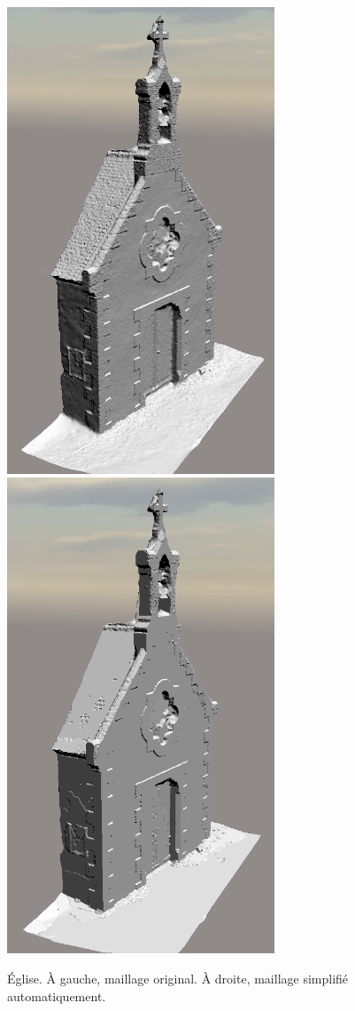 ﻿\documentclass[12pt, twoside]{article}
\begin{document}
\begin{figure}[h]
\centering
\includegraphics[width=8cm,keepaspectratio]{Eglise.png} \includegraphics[width=8cm,keepaspectratio]{EgliseAuto.png}
\caption{Église. À gauche, maillage original. À droite, maillage simplifié automatiquement.}
\end{figure}
\end{document}
